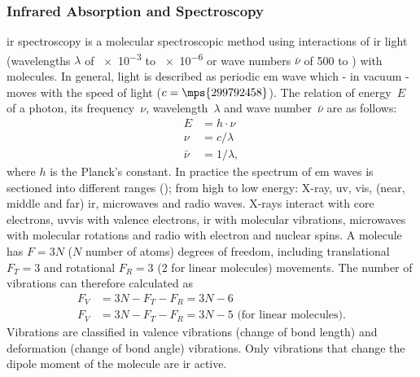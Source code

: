 \subsubsection{Infrared Absorption and Spectroscopy}
\Gls{ir} spectroscopy is a molecular spectroscopic method using interactions of \gls{ir} light (wavelengths $\lambda$ of \num{e-3} to \num{e-6}\m{}
or wave numbers $\bar{\nu}$ of 500 to  ) with molecules. \cite{Schwedt2008}
In general, light is described as periodic \gls{em} wave 
which - in vacuum - moves with the speed of light ($c = \mps{299792458}$).
The relation of energy~$E$ of a photon, its frequency~$\nu$, wavelength~$\lambda$ and wave number~$\bar{\nu}$ are as follows:
\begin{align*}
	E &= h \cdot \nu \\
	\nu &= c/ \lambda \\
	\bar{\nu} &= 1/\lambda,
\end{align*}
where $h$ is the Planck's constant.
In practice the spectrum of \gls{em} waves is sectioned into different ranges ();
from high to low energy: X-ray, \gls{uv}, \gls{vis}, (near, middle and far) \gls{ir}, microwaves and radio waves. 
X-rays interact with core electrons, \gls{uv}\gls{vis} with valence electrons, \gls{ir} with molecular vibrations, microwaves with molecular rotations and radio with electron and nuclear spins. 
%
A molecule has $F=3N$ ($N$ number of atoms) degrees of freedom, including translational $F_T=3$ and rotational $F_R=3$ (2 for linear molecules) movements. 
%
The number of vibrations can therefore calculated as 
\begin{align*}
	F_V &= 3N - F_T - F_R = 3N - 6 \\
	F_V &= 3N - F_T - F_R = 3N - 5 \textrm{ (for linear molecules)}.
\end{align*}
Vibrations are classified in valence vibrations (change of bond length) and deformation (change of bond angle) vibrations\cite{Melker2006}. 
Only vibrations that change the dipole moment of the molecule are \gls{ir} active. 


